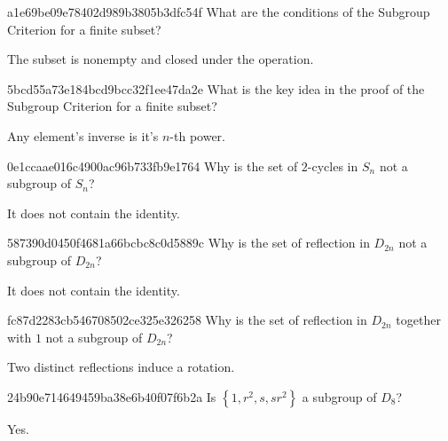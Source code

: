 \begin{note}{a1e69be09e78402d989b3805b3dfc54f}
    What are the conditions of the Subgroup Criterion for a finite subset?

    \begin{cloze}{1}
        The subset is nonempty and closed under the operation.
    \end{cloze}
\end{note}

\begin{note}{5bcd55a73e184bcd9bcc32f1ee47da2e}
    What is the key idea in the proof of the Subgroup Criterion for a finite subset?

    \begin{cloze}{1}
        Any element's inverse is it's \({ n }\)-th power.
    \end{cloze}
\end{note}

\begin{note}{0e1ccaae016c4900ac96b733fb9e1764}
    Why is the set of \({ 2 }\)-cycles in \({ S_n }\) not a subgroup of \({ S_n }\)?

    \begin{cloze}{1}
        It does not contain the identity.
    \end{cloze}
\end{note}

\begin{note}{587390d0450f4681a66bcbc8c0d5889c}
    Why is the set of reflection in \({ D_{2n} }\) not a subgroup of \({ D_{2n} }\)?

    \begin{cloze}{1}
        It does not contain the identity.
    \end{cloze}
\end{note}

\begin{note}{fc87d2283cb546708502ce325e326258}
    Why is the set of reflection in \({ D_{2n} }\) together with \({ 1 }\) not a subgroup of \({ D_{2n} }\)?

    \begin{cloze}{1}
        Two distinct reflections induce a rotation.
    \end{cloze}
\end{note}

\begin{note}{24b90e714649459ba38e6b40f07f6b2a}
    Is \({ \left\{ 1, r^2, s, sr^2 \right\} }\) a subgroup of \({ D_8 }\)?

    \begin{cloze}{1}
        Yes.
    \end{cloze}
\end{note}

